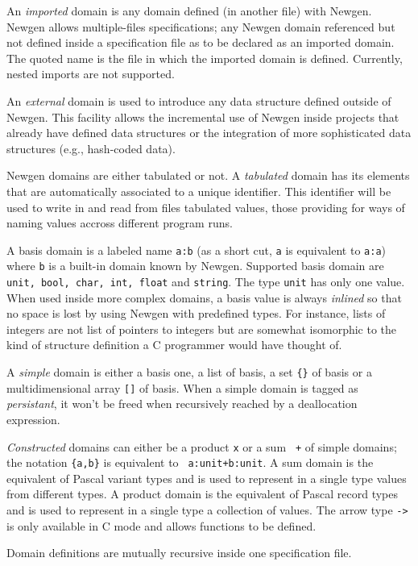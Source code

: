 An {\em imported} domain is any domain defined (in another file) with
Newgen. Newgen allows multiple-files specifications; any Newgen domain
referenced but not defined inside a specification file as to be declared
as an imported domain. The quoted name is the file in which the imported
domain is defined. Currently, nested imports are not supported.

An {\em external} domain is used to introduce any data structure defined
outside of Newgen. This facility allows the incremental use of Newgen
inside projects that already have defined data structures or the
integration of more sophisticated data structures (e.g., hash-coded
data).

Newgen domains are either tabulated or not. A {\em tabulated} domain has
its elements that are automatically associated to a unique identifier.
This identifier will be used to write in and read from files tabulated
values, those providing for ways of naming values accross different
program runs.

A basis domain is a labeled name {\tt a:b} (as a short cut, {\tt a} is
equivalent to {\tt a:a}) where {\tt b} is a built-in domain known by
Newgen. Supported basis domain are {\tt unit, bool, char, int, float}
and {\tt string}. The type {\tt unit} has only one value.  When used
inside more complex domains, a basis value is always {\em inlined} so
that no space is lost by using Newgen with predefined types. For
instance, lists of integers are not list of pointers to integers but are
somewhat isomorphic to the kind of structure definition a C programmer
would have thought of.

A {\em simple} domain is either a basis one, a list {\tt *} of basis, a
set {\tt \{\}} of basis or a multidimensional array {\tt []} of basis.
When a simple domain is tagged as {\em persistant}, it won't be freed
when recursively reached by a deallocation expression.

{\em Constructed} domains can either be a product {\tt x} or a sum {\tt
+} of simple domains; the notation {\tt \{a,b\}} is equivalent to {\tt
a:unit+b:unit}. A sum domain is the equivalent of Pascal variant types
and is used to represent in a single type values from different types. A
product domain is the equivalent of Pascal record types and is used to
represent in a single type a collection of values.  The arrow type
\verb:->: is only available in C mode and allows functions to be
defined. 

Domain definitions are mutually recursive inside one specification
file.

